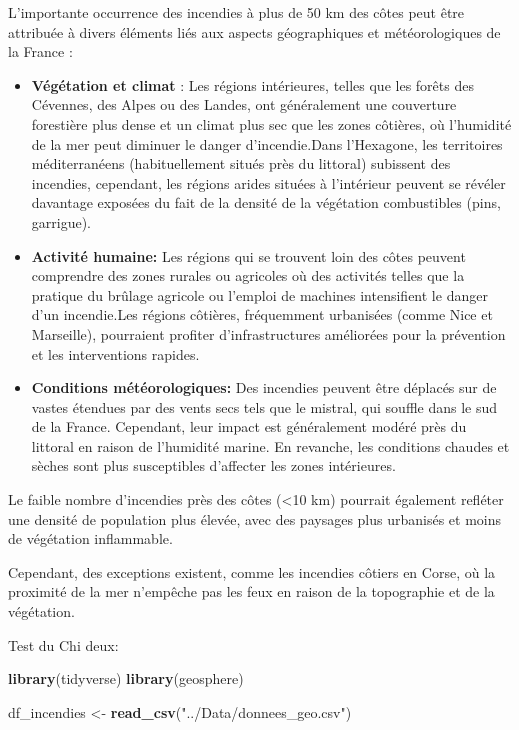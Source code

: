 \documentclass[
]{article}
\newenvironment{Shaded}{\begin{snugshade}}{\end{snugshade}}
\newcommand{\FunctionTok}[1]{\textcolor[rgb]{0.13,0.29,0.53}{\textbf{#1}}}
\newcommand{\NormalTok}[1]{#1}
\newcommand{\OtherTok}[1]{\textcolor[rgb]{0.56,0.35,0.01}{#1}}
\newcommand{\StringTok}[1]{\textcolor[rgb]{0.31,0.60,0.02}{#1}}
\begin{document}
L'importante occurrence des incendies à plus de 50 km des côtes peut
être attribuée à divers éléments liés aux aspects géographiques et
météorologiques de la France :

\begin{itemize}
\item
  \textbf{Végétation et climat} : Les régions intérieures, telles que
  les forêts des Cévennes, des Alpes ou des Landes, ont généralement une
  couverture forestière plus dense et un climat plus sec que les zones
  côtières, où l'humidité de la mer peut diminuer le danger
  d'incendie.Dans l'Hexagone, les territoires méditerranéens
  (habituellement situés près du littoral) subissent des incendies,
  cependant, les régions arides situées à l'intérieur peuvent se révéler
  davantage exposées du fait de la densité de la végétation combustibles
  (pins, garrigue).
\item
  \textbf{Activité humaine:} Les régions qui se trouvent loin des côtes
  peuvent comprendre des zones rurales ou agricoles où des activités
  telles que la pratique du brûlage agricole ou l'emploi de machines
  intensifient le danger d'un incendie.Les régions côtières, fréquemment
  urbanisées (comme Nice et Marseille), pourraient profiter
  d'infrastructures améliorées pour la prévention et les interventions
  rapides.
\item
  \textbf{Conditions météorologiques:} Des incendies peuvent être
  déplacés sur de vastes étendues par des vents secs tels que le
  mistral, qui souffle dans le sud de la France. Cependant, leur impact
  est généralement modéré près du littoral en raison de l'humidité
  marine. En revanche, les conditions chaudes et sèches sont plus
  susceptibles d'affecter les zones intérieures.
\end{itemize}

Le faible nombre d'incendies près des côtes (\textless10 km) pourrait
également refléter une densité de population plus élevée, avec des
paysages plus urbanisés et moins de végétation inflammable.

Cependant, des exceptions existent, comme les incendies côtiers en
Corse, où la proximité de la mer n'empêche pas les feux en raison de la
topographie et de la végétation.

Test du Chi deux:

\begin{Shaded}
\begin{Highlighting}[]
\FunctionTok{library}\NormalTok{(tidyverse)}
\FunctionTok{library}\NormalTok{(geosphere)}

\NormalTok{df\_incendies }\OtherTok{\textless{}{-}} \FunctionTok{read\_csv}\NormalTok{(}\StringTok{"../Data/donnees\_geo.csv"}\NormalTok{)}
\end{Highlighting}
\end{Shaded}
\end{document}

